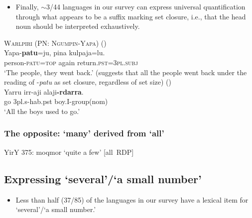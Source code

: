 \documentclass{article}
\makeatletter
\newcommand{\ofy}{/85} %
\makeatother
\begin{document}
\begin{itemize}
\item Finally, $\sim$3/44 languages in our survey can express universal quantification through what appears to be a suffix marking set closure, i.e., that the head noun should be interpreted exhaustively. 
\end{itemize}

\begin{exe}
  \ex \textsc{Warlpiri (PN: Ngumpin-Yapa)} (\citealt[13--14]{bowler17})\\
  \gll Yapa-\textbf{patu}=ju, pina kulpaja=lu.\\
  person-\textsc{patu}=\textsc{top} again return.\textsc{pst}=\textsc{3pl.subj}\\
  \glt `The people, they went back.' (suggests that all the people went back under the reading of -\textit{patu} as set closure, regardless of set size)
   (\citealt[80]{nordlinger98})\\
  \gll Yarru irr-aji  alaji\textbf{-rdarra}.\\
  go  3{\sc pl.s-hab.pst} boy.I-{\sc group(nom)}\\
  \glt `All the boys used to go.' 
\end{exe}


\subsubsection{The opposite: `many' derived from `all'}
\label{sec:rdpall}
YirY 375: moqmor `quite a few' [all~RDP]

\subsection{Expressing `several'/`a small number'}

\begin{itemize}
\item Less than half (37\ofy) of the languages in our survey have a lexical item for `several'/`a small number.'
\end{itemize}
\end{document}
